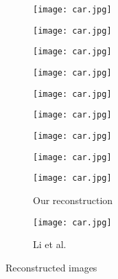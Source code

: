 \begin{figure}[H]
		\centering
	\begin{subfigure}[b]{0.35\linewidth}
		\texttt{[image: car.jpg]} %
	\end{subfigure}
	\begin{subfigure}[b]{0.35\linewidth}
		\texttt{[image: car.jpg]} %
	\end{subfigure}
		\centering
	\begin{subfigure}[b]{0.35\linewidth}
		\texttt{[image: car.jpg]} %
	\end{subfigure}
	\begin{subfigure}[b]{0.35\linewidth}
		\texttt{[image: car.jpg]} %
	\end{subfigure}
		\centering
	\begin{subfigure}[b]{0.35\linewidth}
		\texttt{[image: car.jpg]} %
	\end{subfigure}
	\begin{subfigure}[b]{0.35\linewidth}
		\texttt{[image: car.jpg]} %
	\end{subfigure}
	\centering
	\begin{subfigure}[b]{0.35\linewidth}
		\texttt{[image: car.jpg]} %
	\end{subfigure}
	\begin{subfigure}[b]{0.35\linewidth}
		\texttt{[image: car.jpg]} %
	\end{subfigure}
		\centering
	\begin{subfigure}[b]{0.35\linewidth}
		\texttt{[image: car.jpg]} %
		\caption{Our reconstruction}
	\end{subfigure}
	\begin{subfigure}[b]{0.35\linewidth}
		\texttt{[image: car.jpg]} %
		\caption{Li et al. \cite{bib11}}	
	\end{subfigure}
	\caption{Reconstructed images}
	\label{fig:reconstruction}
\end{figure}
  
